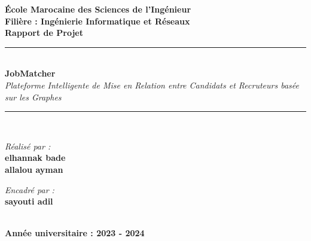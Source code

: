 \documentclass[12pt,a4paper]{report}
\begin{document}
\begin{titlepage}
    \begin{center}
        \vspace*{1cm}
        
        {\LARGE \textbf{École Marocaine des Sciences de l'Ingénieur}}\\[0.5cm]
        {\Large \textbf{Filière : Ingénierie Informatique et Réseaux}}\\[2cm]
        
        {\large \textbf{Rapport de Projet}}\\[0.5cm]
        
        \rule{\linewidth}{0.5mm}\\[0.4cm]
        {\huge \textbf{JobMatcher}}\\[0.2cm]
        {\Large \textit{Plateforme Intelligente de Mise en Relation entre Candidats et Recruteurs basée sur les Graphes}}\\[0.4cm]
        \rule{\linewidth}{0.5mm}\\[2cm]
        
        \begin{minipage}{0.4\textwidth}
            \begin{flushleft} \large
                \emph{Réalisé par :}\\
                \textbf{elhannak bade}\\
                \textbf{allalou ayman}
            \end{flushleft}
        \end{minipage}
        \hfill
        \begin{minipage}{0.4\textwidth}
            \begin{flushright} \large
                \emph{Encadré par :} \\
                \textbf{sayouti adil}
            \end{flushright}
        \end{minipage}\\[3cm]
        
        {\large \textbf{Année universitaire : 2023 - 2024}}
        
    \end{center}
\end{titlepage}
\end{document}
